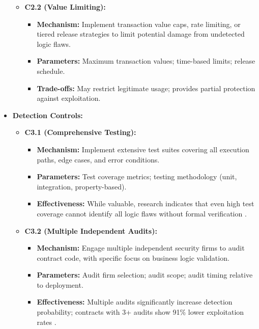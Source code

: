 \begin{itemize}
\begin{itemize}
    \item \textbf{C2.2 (Value Limiting):}
        \begin{itemize}
        \item \textbf{Mechanism:} Implement transaction value caps, rate limiting, or tiered release strategies to limit potential damage from undetected logic flaws.
        \item \textbf{Parameters:} Maximum transaction values; time-based limits; release schedule.
        \item \textbf{Trade-offs:} May restrict legitimate usage; provides partial protection against exploitation.
        \end{itemize}
    \end{itemize}

\item \textbf{Detection Controls:}
    \begin{itemize}
    \item \textbf{C3.1 (Comprehensive Testing):}
        \begin{itemize}
        \item \textbf{Mechanism:} Implement extensive test suites covering all execution paths, edge cases, and error conditions.
        \item \textbf{Parameters:} Test coverage metrics; testing methodology (unit, integration, property-based).
        \item \textbf{Effectiveness:} While valuable, research indicates that even high test coverage cannot identify all logic flaws without formal verification \cite{praitheeshan2019systematic}.
        \end{itemize}
    
    \item \textbf{C3.2 (Multiple Independent Audits):}
        \begin{itemize}
        \item \textbf{Mechanism:} Engage multiple independent security firms to audit contract code, with specific focus on business logic validation.
        \item \textbf{Parameters:} Audit firm selection; audit scope; audit timing relative to deployment.
        \item \textbf{Effectiveness:} Multiple audits significantly increase detection probability; contracts with 3+ audits show 91\% lower exploitation rates \cite{zhou2023sok}.
        \end{itemize}
    \end{itemize}
\end{itemize}

